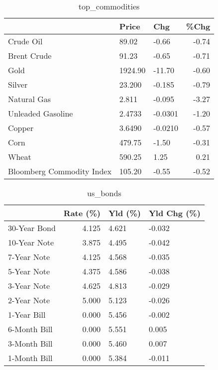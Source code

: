 \documentclass{article}%
\begin{document}
\begin{table}[htbp]%
\caption{top\_commodities}%
\centering%
\begin{adjustbox}{width=1\textwidth}%
\begin{tabular}{lllr}
\toprule
                          &   Price &     Chg &  \%Chg \\
\midrule
               Crude Oil  &   89.02 &   -0.66 & -0.74 \\
             Brent Crude  &   91.23 &   -0.65 & -0.71 \\
                    Gold  & 1924.90 &  -11.70 & -0.60 \\
                  Silver  &  23.200 &  -0.185 & -0.79 \\
             Natural Gas  &   2.811 &  -0.095 & -3.27 \\
       Unleaded Gasoline  &  2.4733 & -0.0301 & -1.20 \\
                  Copper  &  3.6490 & -0.0210 & -0.57 \\
                    Corn  &  479.75 &   -1.50 & -0.31 \\
                   Wheat  &  590.25 &    1.25 &  0.21 \\
Bloomberg Commodity Index &  105.20 &   -0.55 & -0.52 \\
\bottomrule
\end{tabular}
%
\end{adjustbox}%
\end{table}

%


\begin{table}[htbp]%
\caption{us\_bonds}%
\centering%
\begin{adjustbox}{width=1\textwidth}%
\begin{tabular}{lrll}
\toprule
             &  Rate (\%) & Yld (\%) & Yld Chg (\%) \\
\midrule
30-Year Bond &     4.125 &   4.621 &      -0.032 \\
10-Year Note &     3.875 &   4.495 &      -0.042 \\
 7-Year Note &     4.125 &   4.568 &      -0.035 \\
 5-Year Note &     4.375 &   4.586 &      -0.038 \\
 3-Year Note &     4.625 &   4.813 &      -0.029 \\
 2-Year Note &     5.000 &   5.123 &      -0.026 \\
 1-Year Bill &     0.000 &   5.456 &      -0.002 \\
6-Month Bill &     0.000 &   5.551 &       0.005 \\
3-Month Bill &     0.000 &   5.460 &       0.007 \\
1-Month Bill &     0.000 &   5.384 &      -0.011 \\
\bottomrule
\end{tabular}
%
\end{adjustbox}%
\end{table}
\end{document}
